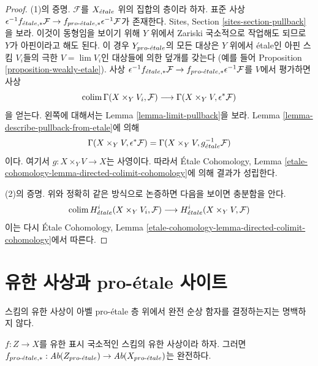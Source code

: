\begin{proof}
(1)의 증명. $\mathcal{F}$를 $X_{\acute{e}tale}$ 위의 집합의 층이라 하자.
표준 사상 $\epsilon^{-1}f_{{\acute{e}tale}, *}\mathcal{F} \to
f_{{pro\text{-}\acute{e}tale}, *}\epsilon^{-1}\mathcal{F}$가 존재한다. Sites, Section
\ref{sites-section-pullback}을 보라. 이것이 동형임을 보이기 위해
$Y$ 위에서 Zariski 국소적으로 작업해도 되므로 $Y$가 아핀이라고 해도
된다. 이 경우 $Y_{pro\text{-}\acute{e}tale}$의 모든 대상은 $Y$ 위에서 \'etale인 아핀
스킴 $V_i$들의 극한 $V = \lim V_i$인 대상들에 의한 덮개를 갖는다
(예를 들어 Proposition \ref{proposition-weakly-etale}). 사상
$\epsilon^{-1}f_{{\acute{e}tale}, *}\mathcal{F} \to
f_{{pro\text{-}\acute{e}tale}, *}\epsilon^{-1}\mathcal{F}$를 $V$에서 평가하면 사상
$$
\mathop{\mathrm{colim}}\nolimits \Gamma(X \times_Y V_i, \mathcal{F})
\longrightarrow
\Gamma(X \times_Y V, \epsilon^*\mathcal{F})
$$
을 얻는다. 왼쪽에 대해서는 Lemma \ref{lemma-limit-pullback}을 보라.
Lemma \ref{lemma-describe-pullback-from-etale}에 의해
$$
\Gamma(X \times_Y V, \epsilon^*\mathcal{F}) =
\Gamma(X \times_Y V, g_{\acute{e}tale}^{-1}\mathcal{F})
$$
이다. 여기서 $g : X \times_Y V \to X$는 사영이다. 따라서 \'Etale
Cohomology, Lemma
\ref{etale-cohomology-lemma-directed-colimit-cohomology}에 의해 결과가
성립한다.

\medskip\noindent
(2)의 증명. 위와 정확히 같은 방식으로 논증하면 다음을 보이면
충분함을 안다.
$$
\mathop{\mathrm{colim}}\nolimits H^i_{\acute{e}tale}(X \times_Y V_i, \mathcal{F})
\longrightarrow
H^i_{\acute{e}tale}(X \times_Y V, \mathcal{F})
$$
이는 다시 \'Etale Cohomology, Lemma
\ref{etale-cohomology-lemma-directed-colimit-cohomology}에서 따른다.
\end{proof}






\section{유한 사상과 pro-\'etale 사이트}
\label{section-finite}

\noindent
스킴의 유한 사상이 아벨 pro-\'etale 층 위에서 완전 순상 함자를
결정하는지는 명백하지 않다.

\begin{lemma}
\label{lemma-finite}
$f : Z \to X$를 유한 표시 국소적인 스킴의 유한 사상이라 하자.
그러면
$f_{{pro\text{-}\acute{e}tale}, *} : \textit{Ab}(Z_{pro\text{-}\acute{e}tale}) \to
\textit{Ab}(X_{pro\text{-}\acute{e}tale})$는 완전하다.
\end{lemma}

